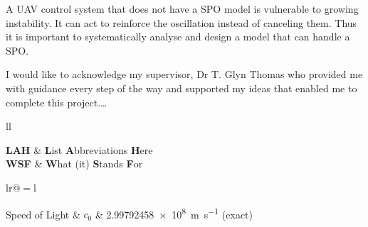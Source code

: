 \documentclass[
11pt, %
english, %
singlespacing, %
headsepline, %
]{MastersDoctoralThesis} %
\begin{document}
A UAV control system that does not have a SPO model is vulnerable to growing instability. It can act to reinforce the oscillation instead of canceling them. Thus it is important to systematically analyse and design a model that can handle a SPO.  
\newpage
\begingroup
\let\clearpage\relax
\let\cleardoublepage\relax
\begin{acknowledgements}
\addchaptertocentry{\acknowledgementname} %
I would like to acknowledge my supervisor, Dr T. Glyn Thomas who provided me with guidance every step of the way and supported my ideas that enabled me to complete this project.\ldots

\end{acknowledgements}
\endgroup
\newpage
\begingroup
\let\clearpage\relax
\let\cleardoublepage\relax
\begin{abbreviations}{ll} %

\textbf{LAH} & \textbf{L}ist \textbf{A}bbreviations \textbf{H}ere\\
\textbf{WSF} & \textbf{W}hat (it) \textbf{S}tands \textbf{F}or\\

\end{abbreviations}
\endgroup
\newpage
\begingroup
\let\clearpage\relax
\let\cleardoublepage\relax
\begin{constants}{lr@{${}={}$}l} %


Speed of Light & $c_{0}$ & \SI{2.99792458e8}{\meter\per\second} (exact)\\

\end{constants}
\end{document}
